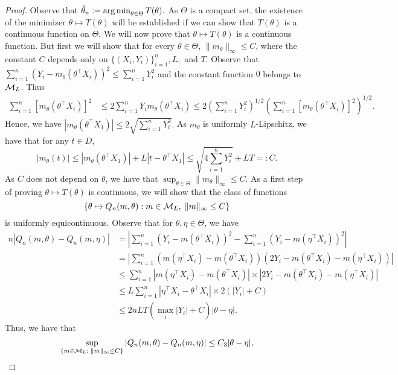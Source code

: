 \begin{proof}
Observe  that $\check{\theta}_n:= \operatorname*{arg\,min}_{\theta \in \Theta} T(\theta).$ As $\Theta$ is a compact set, the existence of the minimizer $\theta\mapsto T(\theta)$ will be established if we can show that $T(\theta)$ is a continuous function on $\Theta$. We will now prove that $\theta \mapsto T(\theta)$ is a continuous function. But first we will show that  for every $\theta \in \Theta$,  $\|m_\theta\|_\infty\le C$, where the constant $C$ depends only on $\{(X_i,Y_i)\}_{i=1}^n, L,$ and $T.$  Observe that $\sum_{i=1}^n(Y_i - m_\theta(\theta^\top X_i))^2 \le \sum_{i=1}^nY_i^2$ and the constant function $0$  belongs to $\mathcal{M}_L$. Thus
\begin{align*}
\sum_{i=1}^n \left[m_\theta(\theta^\top X_i)\right]^2 &\le 2\sum_{i=1}^n Y_im_\theta(\theta^\top X_i) \le 2\left(\sum_{i=1}^n Y_i^2\right)^{1/2}\left(\sum_{i=1}^n \left[m_\theta(\theta^\top X_i)\right]^2\right)^{1/2}.
\end{align*}
Hence, we have $|m_\theta(\theta^\top X_1)| \le 2 \sqrt{\sum_{i=1}^n Y_i^ 2}.$ As $m_\theta$ is uniformly $L$-Lipschitz, we have that for any $t\in D$, \[
|m_{\theta}(t)| \le |m_\theta(\theta^\top X_1)| + L |t-\theta^\top X_1| \le \sqrt{4 \sum_{i=1}^n Y_i^ 2} + L T=:C. \]
 As $C$ does not depend on $\theta$, we have that $\sup_{\theta \in \Theta} \|m_{\theta}\|_{\infty} \le C.$ As a first step of proving $\theta\mapsto T(\theta)$ is continuous, we will show that the class of functions %
\[\{ \theta\mapsto Q_n(m,\theta) : m \in\mathcal{M}_L,\;\|m\|_{\infty}\le C\}\] is uniformly equicontinuous. Observe that for $\theta, \eta\in\Theta$, we have
\begin{align*}
 n|Q_n(m,\theta) - Q_n(m,\eta)| &= \left|\sum_{i=1}^n (Y_i - m(\theta^{\top}X_i))^2 - \sum_{i=1}^n (Y_i - m(\eta^{\top}X_i))^2\right|\\
 &= \left|\sum_{i=1}^n (m(\eta^{\top}X_i) - m(\theta^{\top}X_i))(2Y_i - m(\theta^{\top}X_i) - m(\eta^{\top}X_i))\right|\\
&\le \sum_{i=1}^n |m(\eta^{\top}X_i) - m(\theta^{\top}X_i)|\times|2Y_i - m(\theta^{\top}X_i) - m(\eta^{\top}X_i)|\\
 &\le L\sum_{i=1}^n |\eta^{\top}X_i - \theta^{\top}X_i|\times 2 \left(|Y_i|+C\right)\\
 &\le 2nLT\left(\max_i|Y_i| + C\right)|\theta - \eta|.
 \end{align*}
 Thus, we have that
\begin{equation}\label{eq:q_equi}
\sup_{\left\{m \in\M_L : \;\|m\|_{\infty}\le C\right\} }|Q_n(m,\theta) -Q_n(m,\eta)| \le C_3 |\theta-\eta|,

\end{equation}
\end{proof}
